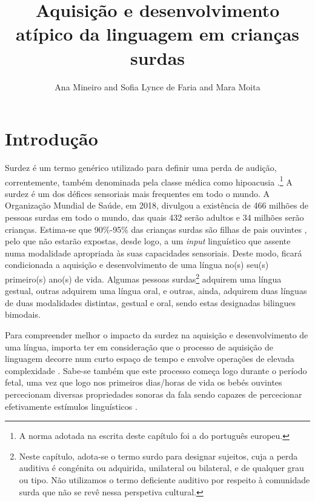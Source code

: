 \documentclass[output=paper,colorlinks,citecolor=brown,booklanguage=portuguese]{langscibook}
\title{Aquisição e desenvolvimento atípico da linguagem em crianças surdas}
\author{Ana Mineiro \affiliation{Instituto de Ciências da Saúde, Universidade Católica Portuguesa, CIIS} and  Sofia Lynce de Faria\affiliation{Instituto de Ciências da Saúde, Universidade Católica Portuguesa, CIIS} and  Mara Moita\affiliation{Instituto de Ciências da Saúde, Universidade Católica Portuguesa, CIIS; Universidade Nova de Lisboa, CLUNL} }
\begin{document}
\maketitle

\section{Introdução}

Surdez é um termo genérico utilizado para definir uma perda de audição, correntemente, também denominada pela classe médica como hipoacusia \citep{Paco2010}.\footnote{A norma adotada na escrita deste capítulo foi a do português europeu.}
A surdez é um dos défices sensoriais mais frequentes em todo o mundo. A Organização Mundial de Saúde, em 2018, divulgou a existência de 466 milhões de pessoas surdas em todo o mundo, das quais 432 serão adultos e 34 milhões serão crianças. Estima-se que 90\%-95\% das crianças surdas são filhas de pais ouvintes \citep{Mitchell2004}, pelo que não estarão expostas, desde logo, a um \emph{input} linguístico que assente numa modalidade apropriada às suas capacidades sensoriais. Deste modo, ficará condicionada a aquisição e desenvolvimento de uma língua no(s) seu(s) primeiro(s) ano(s) de vida. Algumas pessoas surdas\footnote{Neste capítulo, adota-se o termo surdo para designar sujeitos, cuja a perda auditiva é congénita ou adquirida, unilateral ou bilateral, e de qualquer grau ou tipo. Não utilizamos o termo deficiente auditivo por respeito à comunidade surda que não se revê nessa perspetiva cultural.} adquirem uma língua gestual, outras adquirem uma língua oral, e outras, ainda, adquirem duas línguas de duas modalidades distintas, gestual e oral, sendo estas designadas bilingues bimodais.

Para compreender melhor o impacto da surdez na aquisição e desenvolvimento de uma língua, importa ter em consideração que o processo de aquisição de linguagem decorre num curto espaço de tempo e envolve operações de elevada complexidade \citep{SimSim2017}. Sabe-se também que este processo começa logo durante o período fetal, uma vez que logo nos primeiros dias/horas de vida os bebés ouvintes percecionam diversas propriedades sonoras da fala sendo capazes de percecionar efetivamente estímulos linguísticos \citep{Moon2013}. 
\end{document}
